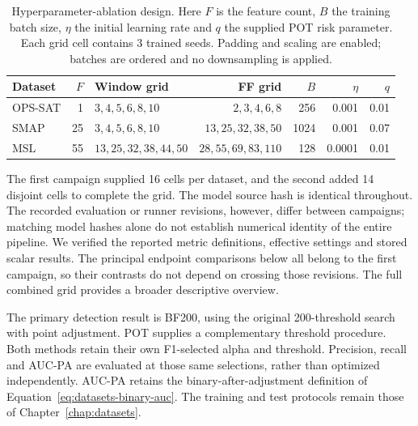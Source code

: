 \begin{table}[htbp]
  \centering
  \small
  \setlength{\tabcolsep}{5pt}
  \begin{tabular}{@{}lrlrrrr@{}}
    \toprule
    Dataset & \(F\) & Window grid & FF grid & \(B\) & \(\eta\) & \(q\) \\
    \midrule
    \acs{OPS-SAT} & \num{1} & \(3,4,5,6,8,10\) & \(2,3,4,6,8\) & \num{256} & \num{0.001} & \num{0.01} \\
    \acs{SMAP} & \num{25} & \(3,4,5,6,8,10\) & \(13,25,32,38,50\) & \num{1024} & \num{0.001} & \num{0.07} \\
    \acs{MSL} & \num{55} & \(13,25,32,38,44,50\) & \(28,55,69,83,110\) & \num{128} & \num{0.0001} & \num{0.01} \\
    \bottomrule
  \end{tabular}
  \caption{Hyperparameter-ablation design. Here \(F\) is the feature count,
  \(B\) the training batch size, \(\eta\) the initial learning rate and
  \(q\) the supplied \acs{POT} risk parameter. Each grid cell contains
  \num{3} trained seeds. Padding and scaling are enabled; batches are
  ordered and no downsampling is applied.}
  \label{tab:ablation-design}
\end{table}

The first campaign supplied \num{16} cells per dataset, and the second
added \num{14} disjoint cells to complete the grid. The model source hash
is identical throughout. The recorded evaluation or runner revisions,
however, differ between campaigns; matching model hashes alone do not
establish numerical identity of the entire pipeline. We verified the
reported metric definitions, effective settings and stored scalar results.
The principal endpoint comparisons below all belong to the first campaign,
so their contrasts do not depend on crossing those revisions. The full
combined grid provides a broader descriptive overview.

The primary detection result is BF200, using the original
\num{200}-threshold search with point adjustment. \ac{POT} supplies a
complementary threshold procedure. Both methods retain their own
F1-selected alpha and threshold. Precision, recall and AUC-PA are evaluated
at those same selections, rather than optimized independently.
AUC-PA retains the binary-after-adjustment definition of
Equation~\eqref{eq:datasets-binary-auc}. The training and test protocols
remain those of Chapter~\ref{chap:datasets}.

